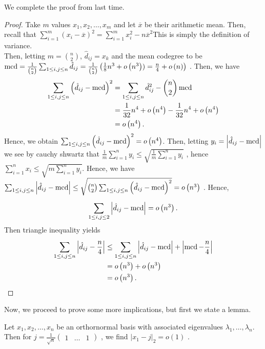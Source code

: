 We complete the proof from last time.\\
\begin{proof}

Take \(m\)  values \(x_1, x_2, \ldots, x_{m}\)  and let \(\overline{x}\)  be their arithmetic mean. Then, recall that \(\sum_{i= 1}^{m} \left( x_{i} - \overline{x} \right)^2 = \sum_{i= 1}^{m} x_{i}^2 - n\overline{x}^2 \)This is simply the definition of variance.\\
Then, letting \(m = \binom{n}{2}\), \(\hat{d}_{ij}= x_{k}\)  and the mean codegree to be \(\operatorname{mcd} = \frac{1}{\binom{n}{2}}\sum_{1\le i, j \le n}^{} \hat{d}_{ij} = \frac{1}{\binom{n}{2}} \left( \frac{1}{8}n^3 + o\left( n^3 \right) ) = \frac{n}{4} + o\left( n \right)  \right) \) . Then, we have \begin{align*}
	\sum_{1\le i , j \le n}^{} \left( \hat{d}_{ij}- \operatorname{mcd} \right) ^2 &= \sum_{1 \le i, j \le n}^{} \hat{d}_{ij}^2 - \binom{n}{2}\operatorname{mcd}\\
									&= \frac{1}{32} n^{4} + o\left( n^{4} \right)- \frac{1}{32}n^{4} + o\left( n^{4} \right)   \\
									&= o\left( n^{4} \right)
.\end{align*}
Hence, we obtain \(\sum_{1 \le i, j \le n}^{} \left( \hat{d}_{ij} - \operatorname{mcd} \right) ^2 = o\left( n^{4} \right) \). Then, letting \(y_{i} = \left| \hat{d}_{ij} - \operatorname{mcd}  \right| \) we see by cauchy shwartz that \(\frac{1}{m}\sum_{i=1}^{n} y_{i} \le\sqrt{\frac{1}{m} \sum_{i= 1}^{n} y_{i}}  \) , hence \(\sum_{i= 1}^{n} x_{i} \le \sqrt{m \sum_{i= 1}^{n} y_{i}} \). Hence, we have \(\sum_{1 \le i, j \le n}^{} \left| \hat{d}_{ij} - \operatorname{mcd} \right| \le \sqrt{\binom{n}{2} \sum_{1\le i, j \le n}^{} \left( \hat{d}_{ij} - \operatorname{mcd} \right) ^2} = o\left( n^3 \right)  \) . Hence, \[
	\sum_{1\le i, j \le 2}^{} \left| \hat{d}_{ij} - \operatorname{mcd} \right|  = o\left( n^3 \right)
.\]
Then triangle inequality yields
\begin{align*}
	\sum_{1 \le i, j \le n}^{} \left| \hat{d}_{ij} - \frac{n}{4} \right| &\le \sum_{1 \le i, j \le n}^{} \left| \hat{d}_{ij} - \operatorname{mcd} \right| + \left| \operatorname{mcd} - \frac{n}{4} \right| \\
									     &= o\left( n^3 \right)   + o\left( n^3 \right) \\
									     &= o\left( n^3 \right)
.\end{align*}
\end{proof}
Now, we proceed to prove some more implications, but first we state a lemma.
\begin{lemma}
	Let \(x_1, x_2, \ldots, x_{n}\)  be an orthornormal basis with associated eigenvalues \(\lambda_1, \ldots, \lambda_{n}\). Then for \(j = \frac{1}{\sqrt{n} } \begin{pmatrix} 1 &  \hdots & 1 \end{pmatrix}\) , we find \(\left| x_1 -j \right|_{2} = o\left( 1 \right)  \) .
\end{lemma}
